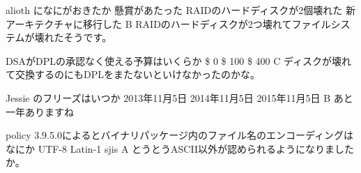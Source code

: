%

\santaku
{alioth になにがおきたか}
{懸賞があたった}
{RAIDのハードディスクが2個壊れた}
{新アーキテクチャに移行した}
{B}
{RAIDのハードディスクが2つ壊れてファイルシステムが壊れたそうです。}

\santaku
{DSAがDPLの承認なく使える予算はいくらか}
{\$ 0}
{\$ 100}
{\$ 400}
{C}
{ディスクが壊れて交換するのにもDPLをまたないといけなかったのかな。}

\santaku
{Jessie のフリーズはいつか}
{2013年11月5日}
{2014年11月5日}
{2015年11月5日}
{B}
{あと一年ありますね}

\santaku
{policy 3.9.5.0によるとバイナリパッケージ内のファイル名のエンコーディングはなにか}
{UTF-8}
{Latin-1}
{sjis}
{A}
{とうとうASCII以外が認められるようになりましたか。}
